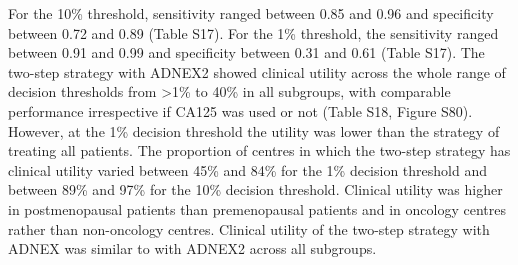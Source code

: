 For the 10\% threshold, sensitivity ranged between 0.85 and 0.96 and specificity between 0.72 and 0.89 (Table S17). For the 1\% threshold, the sensitivity ranged between 0.91 and 0.99 and specificity between 0.31 and 0.61 (Table S17). The two-step strategy with ADNEX2 showed clinical utility across the whole range of decision thresholds from >1\% to 40\%  in all subgroups, with comparable performance irrespective if CA125 was used or not (Table S18, Figure S80). However, at the 1\% decision threshold the utility was lower than the strategy of treating all patients. The proportion of centres in which the two-step strategy has clinical utility varied between 45\% and 84\% for the 1\% decision threshold and between 89\% and 97\% for the 10\% decision threshold. Clinical utility was higher in postmenopausal patients than premenopausal patients and in oncology centres rather than non-oncology centres. Clinical utility of the two-step strategy with ADNEX was similar to with ADNEX2 across all subgroups. 

